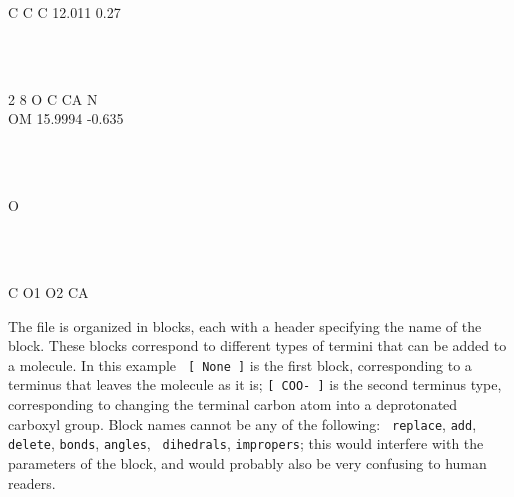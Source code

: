 \begin{tt}
[ None ]\\
\end{tt}\\
\begin{tt}
[ COO- ]\\
\end{tt}\\
\begin{tt}
[ replace ]\\
C       C       C       12.011  0.27\\
\end{tt}\\
\begin{tt}
[ add ]\\
2       8       O       C       CA      N\\
        OM      15.9994 -0.635\\
\end{tt}\\
\begin{tt}
[ delete ]\\
O\\
\end{tt}\\
\begin{tt}
[ impropers ]\\
C       O1      O2      CA\\
\end{tt}

The file is organized in blocks, each with a header specifying the
name of the block. These blocks correspond to different types of
termini that can be added to a molecule. In this example {\tt
[~None~]} is the first block, corresponding to a terminus that leaves
the molecule as it is; {\tt [~COO-~]} is the second terminus type,
corresponding to changing the terminal carbon atom into a deprotonated
carboxyl group. Block names cannot be any of the following: {\tt
replace}, {\tt add}, {\tt delete}, {\tt bonds}, {\tt angles}, {\tt
dihedrals}, {\tt impropers}; this would interfere with the parameters
of the block, and would probably also be very confusing to human
readers.

